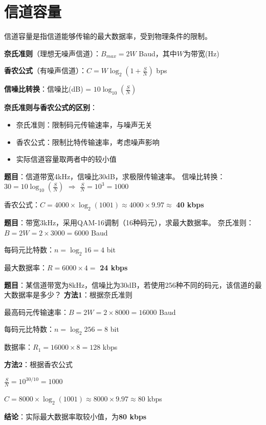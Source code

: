 \documentclass[12pt,a4paper,openany]{ctexbook}
\begin{document}
\section{信道容量}
信道容量是指信道能够传输的最大数据率，受到物理条件的限制。

\begin{formulabox}
\textbf{奈氏准则}（理想无噪声信道）：$B_{max} = 2W$ Baud，其中$W$为带宽(Hz)

\textbf{香农公式}（有噪声信道）：$C = W \log_2(1 + \frac{S}{N})$ bps

\textbf{信噪比转换}：信噪比(dB) = $10\log_{10}(\frac{S}{N})$
\end{formulabox}

\begin{notebox}
\textbf{奈氏准则与香农公式的区别}：
\begin{itemize}[itemsep=0pt]
    \item 奈氏准则：限制码元传输速率，与噪声无关
    \item 香农公式：限制比特传输速率，考虑噪声影响
    \item 实际信道容量取两者中的较小值
\end{itemize}
\end{notebox}

\begin{examplebox}[例题2.1 信道容量计算]
\textbf{题目}：信道带宽4kHz，信噪比30dB，求极限传输速率。
\tcblower
信噪比转换：$30 = 10\log_{10}(\frac{S}{N})$ $\Rightarrow$ $\frac{S}{N} = 10^3 = 1000$

香农公式：$C = 4000 \times \log_2(1001) \approx 4000 \times 9.97 \approx$ \textbf{40 kbps}
\end{examplebox}

\begin{examplebox}[例题2.2 综合计算]
\textbf{题目}：带宽3kHz，采用QAM-16调制（16种码元），求最大数据率。
\tcblower
奈氏准则：$B = 2W = 2 \times 3000 = 6000$ Baud

每码元比特数：$n = \log_2 16 = 4$ bit

最大数据率：$R = 6000 \times 4 = $ \textbf{24 kbps}
\end{examplebox}

\begin{examplebox}[例题2.3 奈氏准则与香农公式综合]
\textbf{题目}：某信道带宽为8kHz，信噪比为30dB，若使用256种不同的码元，该信道的最大数据率是多少？
\tcblower
\textbf{方法1}：根据奈氏准则

最高码元传输速率：$B = 2W = 2 \times 8000 = 16000$ Baud

每码元比特数：$n = \log_2 256 = 8$ bit

数据率：$R_1 = 16000 \times 8 = 128$ kbps

\textbf{方法2}：根据香农公式

$\frac{S}{N} = 10^{30/10} = 1000$

$C = 8000 \times \log_2(1001) \approx 8000 \times 9.97 \approx 80$ kbps

\textbf{结论}：实际最大数据率取较小值，为\textbf{80 kbps}
\end{examplebox}
\end{document}
